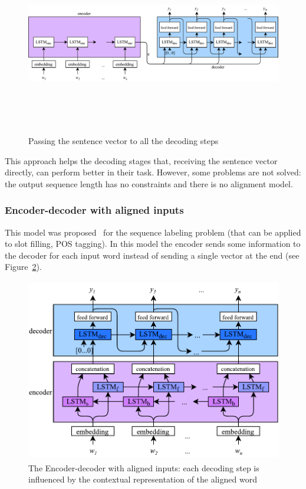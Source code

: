 \begin{figure}[!htb]
    \centering
    \includegraphics[max width=0.8\linewidth,max height=8cm,keepaspectratio]{figures/encoderDecoderKeepC}
    \caption{Passing the sentence vector to all the decoding steps}\label{fig:encoderDecoderKeepC}
\end{figure}

This approach helps the decoding stages that, receiving the sentence vector directly, can perform better in their task. However, some problems are not solved: the output sequence length has no constraints and there is no alignment model.

\subsubsection{Encoder-decoder with aligned inputs}
This model was proposed~\cite{liu2016attention} for the sequence labeling problem (that can be applied to slot filling, POS tagging). In this model the encoder sends some information to the decoder for each input word instead of sending a single vector at the end (see Figure~\ref{fig:encoderDecoderAligned}).

\begin{figure}[!htb]
    \centering
    \includegraphics[max width=0.9\linewidth,max height=8cm,keepaspectratio]{figures/encoderDecoderAligned}
    \caption{The Encoder-decoder with aligned inputs: each decoding step is influenced by the contextual representation of the aligned word}\label{fig:encoderDecoderAligned}
\end{figure}

